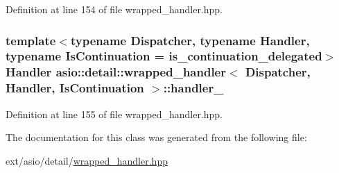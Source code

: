 Definition at line 154 of file wrapped\+\_\+handler.\+hpp.

\hypertarget{classasio_1_1detail_1_1wrapped__handler_ad69cf050b6945ca618f0015ca2c28f98}{}
\subsubsection[{handler\+\_\+}]{\setlength{\rightskip}{0pt plus 5cm}template$<$typename Dispatcher, typename Handler, typename Is\+Continuation = is\+\_\+continuation\+\_\+delegated$>$ Handler {\bf asio\+::detail\+::wrapped\+\_\+handler}$<$ Dispatcher, Handler, Is\+Continuation $>$\+::handler\+\_\+}\label{classasio_1_1detail_1_1wrapped__handler_ad69cf050b6945ca618f0015ca2c28f98}


Definition at line 155 of file wrapped\+\_\+handler.\+hpp.



The documentation for this class was generated from the following file\+:\begin{DoxyCompactItemize}
\item 
ext/asio/detail/\hyperlink{wrapped__handler_8hpp}{wrapped\+\_\+handler.\+hpp}\end{DoxyCompactItemize}
